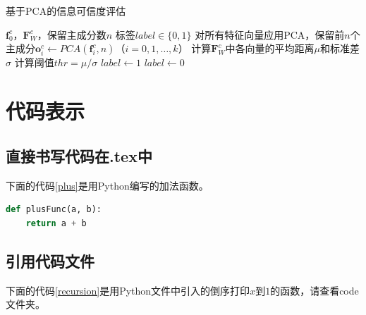 \documentclass[a4paper,AutoFakeBold,oneside,12pt]{book}
\begin{document}
\begin{algorithm}
	\begin{spacing}{1.3}
		\caption{基于PCA的信息可信度评估}
		\label{PCA_model}
		\renewcommand{\algorithmicrequire}{\textbf{输入：}}
		\renewcommand{\algorithmicensure}{\textbf{输出：}}
		\begin{algorithmic}[1]
			\Require $\bm{f}^{c}_{0}$，$\bm{F}^{c}_{W}$，保留主成分数$n$
			\Ensure 标签$label\in \{0,1\}$
			\State 对所有特征向量应用PCA，保留前$n$个主成分$\bm{o}^{c}_{i} \gets PCA(\bm{f}^{c}_{i}, n)$（$i = 0,1,\ldots,k$）
			\State 计算$\bm{F}^{c}_{W}$中各向量的平均距离$\mu$和标准差$\sigma$
			\State 计算阈值$thr = {\mu} / {\sigma}$
			\State $ label \gets 1 $
			\Else
			\State $ label \gets 0 $
			\EndIf
		\end{algorithmic}
	\end{spacing}
\end{algorithm}

\section{代码表示}


\subsection{直接书写代码在.tex中}
下面的代码\ref{plus}是用Python编写的加法函数。

\begin{lstlisting}[language=Python, caption=加法, label=plus, tabsize=2]  
def plusFunc(a, b):
	return a + b 
\end{lstlisting}

\subsection{引用代码文件}
下面的代码\ref{recursion}是用Python文件中引入的倒序打印$x$到$1$的函数，请查看code文件夹。


\end{document}
